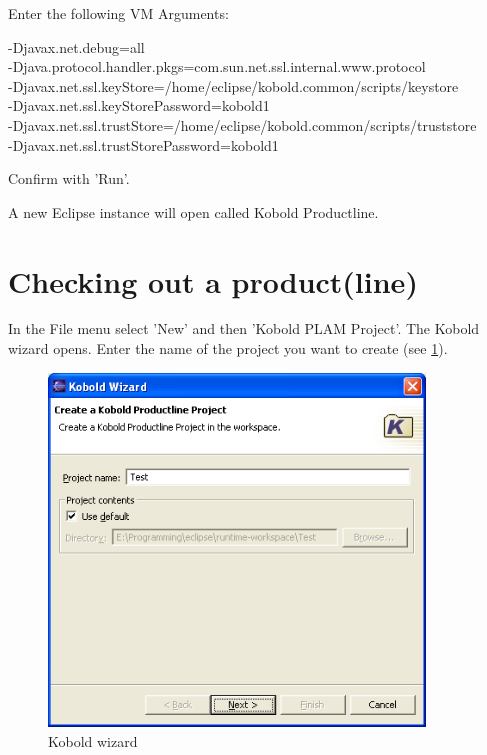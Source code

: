 Enter the following VM Arguments: \par

-Djavax.net.debug=all\\
-Djava.protocol.handler.pkgs=com.sun.net.ssl.internal.www.protocol\\
-Djavax.net.ssl.keyStore=/home/eclipse/kobold.common/scripts/keystore\\
-Djavax.net.ssl.keyStorePassword=kobold1\\
-Djavax.net.ssl.trustStore=/home/eclipse/kobold.common/scripts/truststore\\
-Djavax.net.ssl.trustStorePassword=kobold1 \par

Confirm with 'Run'.\par

A new Eclipse instance will open called Kobold Productline.

\section{Checking out a product(line)}

In the File menu select 'New' and then 'Kobold PLAM Project'. The Kobold wizard opens.
Enter the name of the project you want to create (see \ref{wizard1}).

\begin{figure}[h!]
\begin{center}
\includegraphics[width=10cm]{wizard1.png}
   \caption{Kobold wizard}
\label{wizard1}
\end{center}
\end{figure}\par

